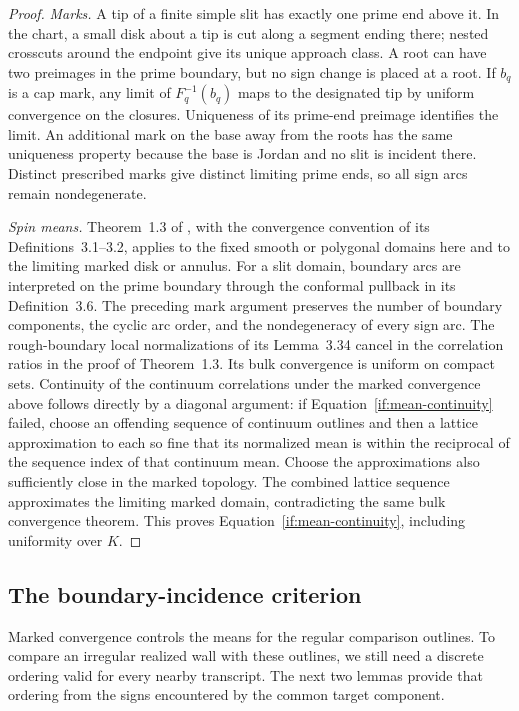 \documentclass[11pt]{article}
\theoremstyle{definition}
\theoremstyle{remark}
\numberwithin{equation}{section}
\begin{document}
\begin{proof}
\emph{Marks.}
A tip of a finite simple slit has exactly one prime end above it.
In the chart, a small disk about a tip is cut along a segment ending
there; nested crosscuts around the endpoint give its unique approach
class.  A root can have two preimages in the prime boundary, but no
sign change is placed at a root.  If $b_q$ is a cap mark, any limit of
$F_q^{-1}(b_q)$ maps to the designated tip by uniform convergence on
the closures.  Uniqueness of its prime-end preimage identifies the
limit.  An additional mark on the base away from the roots has the
same uniqueness property because the base is Jordan and no slit is
incident there.  Distinct prescribed marks give distinct limiting
prime ends, so all sign arcs remain nondegenerate.

\emph{Spin means.}
Theorem~1.3 of \cite{CHI2021}, with the convergence convention of its
Definitions~3.1--3.2, applies to the fixed smooth or polygonal domains
here and to the limiting marked disk or annulus. For a slit domain,
boundary arcs are interpreted on the prime boundary through the
conformal pullback in its Definition~3.6. The preceding mark argument
preserves the number of boundary components, the cyclic arc order,
and the nondegeneracy of every sign arc. The rough-boundary local
normalizations of its Lemma~3.34 cancel in the correlation ratios in
the proof of Theorem~1.3. Its bulk convergence is
uniform on compact sets.  Continuity of the continuum correlations
under the marked convergence above follows directly by a diagonal
argument: if Equation~\eqref{if:mean-continuity} failed, choose an
offending sequence of continuum outlines and then a lattice
approximation to each so fine that its normalized mean is within the
reciprocal of the sequence index of that continuum mean.  Choose the
approximations also sufficiently close in the marked topology.  The
combined lattice sequence approximates the limiting marked domain,
contradicting the same bulk convergence theorem.  This proves
Equation~\eqref{if:mean-continuity}, including uniformity over $K$.
\end{proof}

\subsection{The boundary-incidence criterion}

Marked convergence controls the means for the regular comparison
outlines. To compare an irregular realized wall with these outlines,
we still need a discrete ordering valid for every nearby transcript.
The next two lemmas provide that ordering from the signs encountered
by the common target component.
\end{document}
